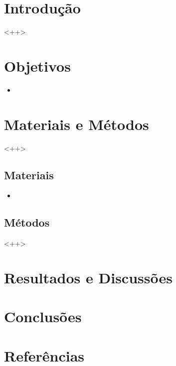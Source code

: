 \documentclass[a4paper, 12pt]{article}
\begin{document}
\tableofcontents
\newpage

\section{Introdução}

	<++>

\section{Objetivos}
  \begin{itemize}
   \item <++>
  \end{itemize}

\section{Materiais e Métodos}

	<++>

  \subsection{Materiais}

  \begin{itemize}
   \item <++>
  \end{itemize}
  
  \subsection{Métodos}

  <++>

\section{Resultados e Discussões}

\section{Conclusões}


\newpage

\section*{Referências}
\footnotesize{
\noindent 
}
\end{document}
